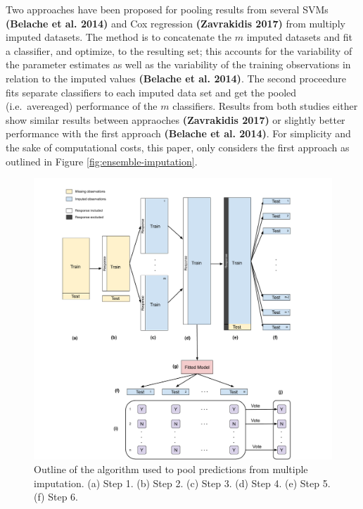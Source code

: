 \documentclass[12pt,]{article}
\begin{document}
Two approaches have been proposed for pooling results from several SVMs
\textbf{(Belache et al. 2014)} and Cox regression \textbf{(Zavrakidis
2017)} from multiply imputed datasets. The method is to concatenate the
\(m\) imputed datasets and fit a classifier, and optimize, to the
resulting set; this accounts for the variability of the parameter
estimates as well as the variability of the training observations in
relation to the imputed values \textbf{(Belache et al. 2014)}. The
second proceedure fits separate classifiers to each imputed data set and
get the pooled (i.e.~avereaged) performance of the \(m\) classifiers.
Results from both studies either show similar results between appraoches
\textbf{(Zavrakidis 2017)} or slightly better performance with the first
approach \textbf{(Belache et al. 2014)}. For simplicity and the sake of
computational costs, this paper, only considers the first approach as
outlined in Figure \ref{fig:ensemble-imputation}.

\begin{figure}[H]

{\centering \includegraphics[width=1\linewidth]{images/ensemble-imputation} 

}

\caption{\label{fig:ensemble-imputation}Outline of the algorithm used to pool predictions from multiple imputation.  (a) Step 1. (b) Step 2. (c) Step 3. (d) Step 4.  (e) Step 5.  (f) Step 6.}\label{fig:unnamed-chunk-4}
\end{figure}
\end{document}
